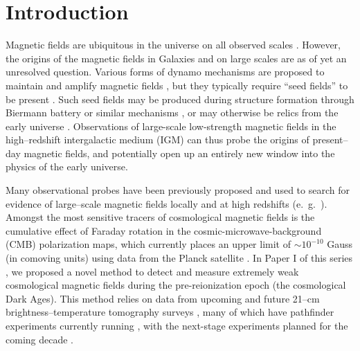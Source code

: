 \section{Introduction}
\label{sec:intro}

Magnetic fields are ubiquitous in the universe on all observed scales \cite{2013A&ARv..21...62D,Vallee04,Neronov10,2005LNP...664...89W,2012SSRv..166..215B}. However, the origins of the magnetic fields in Galaxies and on large scales are as of yet an unresolved question. Various forms of dynamo mechanisms are proposed to maintain and amplify magnetic fields \cite{2013PhRvE..87e3110P}, but they typically require ``seed fields'' to be present \cite{2013A&ARv..21...62D}. Such seed fields may be produced during structure formation through Biermann battery or similar mechanisms \cite{Naoz13,2013PhRvL.111e1303N}, or may otherwise be relics from the early universe \cite{2013A&ARv..21...62D,2012SSRv..166...37W,2014JCAP...05..040K}. Observations of large-scale low-strength magnetic fields in the high--redshift intergalactic medium (IGM) can thus probe the origins of present--day magnetic fields, and potentially open up an entirely new window into the physics of the early universe.

Many observational probes have been previously proposed and used to search for evidence of large--scale magnetic fields locally and at high redshifts (e.~g.~\cite{Yamazaki10,Blasi99,Tavecchio10,Dolag11,2005LNP...664...89W,2014JCAP...01..009K,2013ApJ...770...47K,2014PhRvD..89j3522S,2006MNRAS.372.1060T,2009ApJ...692..236S}). Amongst the most sensitive tracers of cosmological magnetic fields is the cumulative effect of Faraday rotation in the cosmic-microwave-background (CMB) polarization maps, which currently places an upper limit of $\sim$$10^{-10}$ Gauss (in comoving units) using data from the Planck satellite \cite{2015arXiv150201594P}. In Paper I of this series \cite{2014arXiv1410.2250V}, we proposed a novel method to detect and measure extremely weak cosmological magnetic fields during the pre-reionization epoch (the cosmological Dark Ages). This method relies on data from upcoming and future 21--cm brightness--temperature tomography surveys \cite{1997ApJ...475..429M,2004PhRvL..92u1301L}, many of which have pathfinder experiments currently running \cite{2012arXiv1201.1700G,2011AAS...21813206B,2014ApJ...788..106P,2008arXiv0802.1727C,Vanderlinde14,2015AAS...22532803D}, with the next-stage experiments planned for the coming decade \cite{2008arXiv0802.1727C,2015AAS...22532803D}. 

